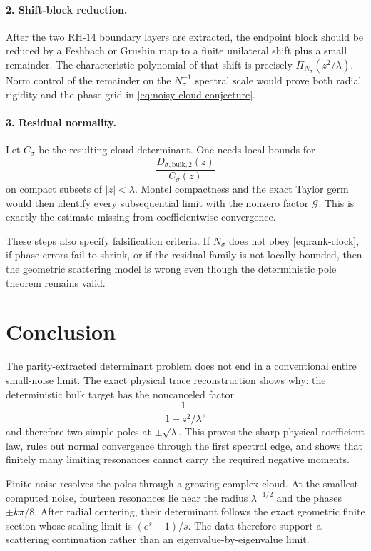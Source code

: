 \documentclass[11pt]{article}
\theoremstyle{definition}
\theoremstyle{remark}
\newcommand{\cG}{\mathcal G}
\begin{document}
\paragraph{2. Shift-block reduction.}
After the two RH-14 boundary layers are extracted, the endpoint block should
be reduced by a Feshbach or Grushin map to a finite unilateral shift plus a
small remainder.  The characteristic polynomial of that shift is precisely
$\Pi_{N_\sigma}(z^2/\lambda)$.  Norm control of the remainder on the
$N_\sigma^{-1}$ spectral scale would prove both radial rigidity and the phase
grid in \eqref{eq:noisy-cloud-conjecture}.

\paragraph{3. Residual normality.}
Let $C_\sigma$ be the resulting cloud determinant.  One needs local bounds
for
\begin{equation}\label{eq:residual-family}
 \frac{D_{\sigma,\mathrm{bulk},2}(z)}{C_\sigma(z)}
\end{equation}
on compact subsets of $|z|<\lambda$.  Montel compactness and the exact Taylor
germ would then identify every subsequential limit with the nonzero factor
$\cG$.  This is exactly the estimate missing from coefficientwise
convergence.

These steps also specify falsification criteria.  If $N_\sigma$ does not obey
\eqref{eq:rank-clock}, if phase errors fail to shrink, or if the residual
family is not locally bounded, then the geometric scattering model is wrong
even though the deterministic pole theorem remains valid.

\section{Conclusion}

The parity-extracted determinant problem does not end in a conventional
entire small-noise limit.  The exact physical trace reconstruction shows why:
the deterministic bulk target has the noncanceled factor
\[
 \frac1{1-z^2/\lambda},
\]
and therefore two simple poles at $\pm\sqrt\lambda$.  This proves the sharp
physical coefficient law, rules out normal convergence through the first
spectral edge, and shows that finitely many limiting resonances cannot carry
the required negative moments.

Finite noise resolves the poles through a growing complex cloud.  At the
smallest computed noise, fourteen resonances lie near the radius
$\lambda^{-1/2}$ and the phases $\pm k\pi/8$.  After radial centering, their
determinant follows the exact geometric finite section whose scaling limit is
$(e^s-1)/s$.  The data therefore support a scattering continuation rather
than an eigenvalue-by-eigenvalue limit.
\end{document}
